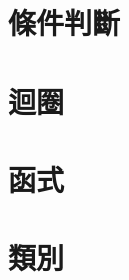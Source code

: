 \documentclass{article}
\begin{document}
\begin{large}

    \section{條件判斷}
    \section{迴圈}
    \section{函式}
    \section{類別}
\end{large}
\end{document}
